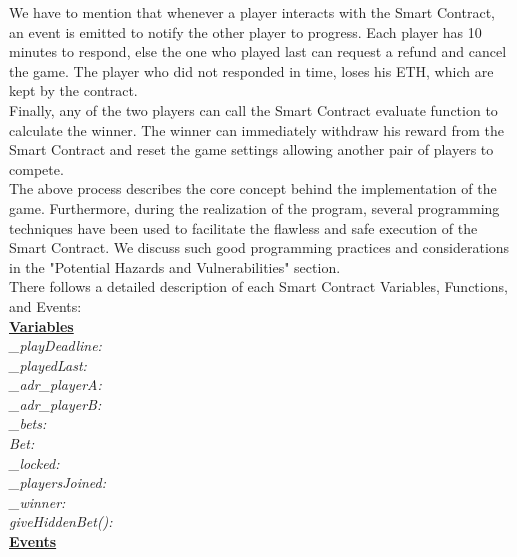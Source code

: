 \documentclass[12pt,a4paper]{article}
\begin{document}
We have to mention that whenever a player interacts with the Smart Contract,
an event is emitted to notify the other player to progress. Each player has
10 minutes to respond, else the one who played last can request a refund and
cancel the game. The player who did not responded in time, loses his ETH, which are kept
by the contract. \\

Finally, any of the two players can call the Smart Contract evaluate function to calculate the winner.
The winner can immediately withdraw his reward from the Smart Contract and reset the game settings
allowing another pair of players to compete. \\

The above process describes the core concept behind the implementation of the game.
Furthermore, during the realization of the program, several programming techniques have
been used to facilitate the flawless and safe execution of the Smart Contract. We discuss
such good programming practices and considerations in the "Potential Hazards and Vulnerabilities" section.\\

There follows a detailed description of each Smart Contract Variables, Functions, and Events: \\

\textbf{\underline{Variables}} \\

\emph{\_playDeadline:} \\

\emph{\_playedLast:} \\

\emph{\_adr\_playerA:} \\

\emph{\_adr\_playerB:} \\

\emph{\_bets:} \\

\emph{Bet:} \\

\emph{\_locked:} \\

\emph{\_playersJoined:} \\

\emph{\_winner:} \\

\emph{giveHiddenBet():} \\

\textbf{\underline{Events}} \\
\end{document}
